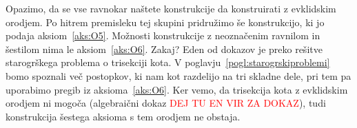Opazimo, da se vse ravnokar naštete konstrukcije da konstruirati z evklidskim orodjem. Po hitrem premisleku tej skupini pridružimo še konstrukcijo, ki jo podaja aksiom~\ref{aks:O5}. Možnosti konstrukcije z neoznačenim ravnilom in šestilom nima le aksiom~\ref{aks:O6}. Zakaj? Eden od dokazov je preko rešitve starogrškega problema o trisekciji kota. V poglavju~\ref{pogl:starogrskiproblemi} bomo spoznali več postopkov, ki nam kot razdelijo na tri skladne dele, pri tem pa uporabimo pregib iz aksioma~\ref{aks:O6}. Ker vemo, da trisekcija kota z evklidskim orodjem ni mogoča (algebraični dokaz \textcolor{red}{DEJ TU EN VIR ZA DOKAZ}), tudi konstrukcija šestega aksioma s tem orodjem ne obstaja.

